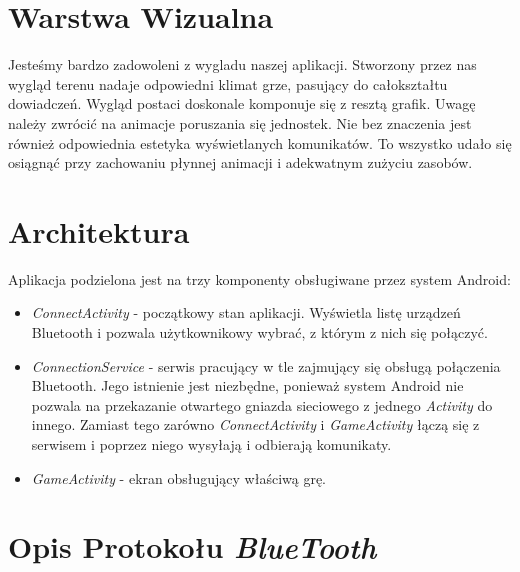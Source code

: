 \documentclass[paper=a4, fontsize=11pt]{scrartcl} %
\numberwithin{equation}{section} %
\numberwithin{figure}{section} %
\numberwithin{table}{section} %
\begin{document}
\section{Warstwa Wizualna}
Jesteśmy bardzo zadowoleni z wygladu naszej aplikacji. Stworzony przez nas wygląd terenu nadaje odpowiedni klimat grze, pasujący do całokształtu dowiadczeń. Wygląd postaci doskonale komponuje się z resztą grafik. Uwagę należy zwrócić na animacje poruszania się jednostek. Nie bez znaczenia jest również odpowiednia estetyka wyświetlanych komunikatów. To wszystko udało się osiągnąć przy zachowaniu płynnej animacji i adekwatnym zużyciu zasobów.

\section{Architektura}
Aplikacja podzielona jest na trzy komponenty obsługiwane przez system Android:

\begin{itemize}

  \item \emph{ConnectActivity} - początkowy stan aplikacji. Wyświetla listę
    urządzeń Bluetooth i pozwala użytkownikowy wybrać, z którym z nich się
    połączyć.

  \item \emph{ConnectionService} - serwis pracujący w tle zajmujący się obsługą
    połączenia Bluetooth. Jego istnienie jest niezbędne, ponieważ system
    Android nie pozwala na przekazanie otwartego gniazda sieciowego z jednego
    \textit{Activity} do innego. Zamiast tego zarówno \textit{ConnectActivity}
    i \textit{GameActivity} łączą się z serwisem i poprzez niego wysyłają i
    odbierają komunikaty.

  \item \emph{GameActivity} - ekran obsługujący właściwą grę.

\end{itemize}

\section{Opis Protokołu \textit{BlueTooth}}


\end{document}
